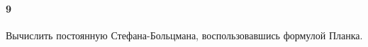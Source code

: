 


	\paragraph{9}
	Вычислить постоянную Стефана-Больцмана, воспользовавшись формулой Планка.\\
	
	


	

	


